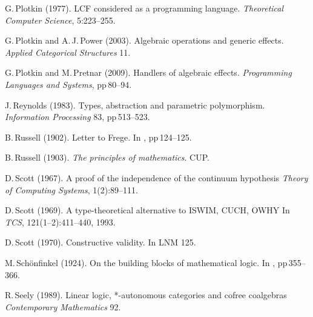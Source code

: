 \documentclass[11pt,twocolumn]{article}
\begin{document}
{\begin{thebibliography}{000}
G.\,Plotkin (1977).
\newblock LCF considered as a programming language.
\newblock \emph{Theoretical Computer Science}, 5:223--255.

G.\,Plotkin and A.\,J.\,Power (2003).
\newblock Algebraic operations and generic effects.
\newblock \emph{Applied Categorical Structures} 11.

G.\,Plotkin and M.\,Pretnar (2009).
\newblock Handlers of algebraic effects.
\newblock \emph{Programming Languages and Systems}, pp\,80--94.


J.\,Reynolds (1983).
\newblock Types, abstraction and parametric polymorphism.
\newblock \emph{Information Processing} 83, pp\,513--523.


B.\,Russell (1902).
\newblock Letter to Frege. 
\newblock In \emph{\cite{vanHeijenoort}}, pp\,124--125. 

B.\,Russell (1903).
\newblock \emph{The principles of mathematics}.
\newblock CUP.

D.\,Scott (1967).
\newblock A proof of the independence of the continuum hypothesis
\newblock \emph{Theory of Computing Systems}, 1(2):89--111.

D.\,Scott (1969).
\newblock A type-theoretical alternative to ISWIM, CUCH, OWHY
\newblock In \emph{TCS}, 121(1--2):411--440, 1993.

D.\,Scott (1970).
\newblock Constructive validity.
\newblock In LNM 125. 

M.\,Sch\"{o}nfinkel (1924).
\newblock On the building blocks of mathematical logic.
\newblock In \emph{\cite{vanHeijenoort}}, pp\,355--366.

R.\,Seely (1989).
\newblock Linear logic, *-autonomous categories and cofree coalgebras 
\newblock \emph{Contemporary Mathematics} 92. 


\end{thebibliography}}
\end{document}

